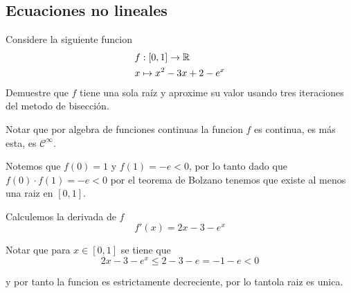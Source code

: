 \documentclass[../main.tex]{subfiles}
\begin{document}
\subsection{Ecuaciones no lineales}
\begin{problem}
  Considere la siguiente funcion
  \begin{align*}
    &f : [0, 1] \to \mathbb{R}\\
    &x \mapsto x^{2} - 3x + 2 - e^{x}
  \end{align*}
  Demuestre que $f$ tiene una sola ra\'iz y aproxime su valor usando tres iteraciones del metodo de bisecci\'on.
\end{problem}

\begin{solution}
  Notar que por algebra de funciones continuas la funcion $f$ es continua, es m\'as esta, es $\mathcal{C}^{\infty}$.

  Notemos que $f(0) = 1$ y $f(1) = -e < 0$, por lo tanto dado que $f(0)\cdot f(1) = -e < 0$ por el teorema de Bolzano tenemos que existe al menos una raiz en $[0, 1]$.

  Calculemos la derivada de $f$
  \begin{equation*}
    f'(x) = 2x - 3 - e^{x}
  \end{equation*}

  Notar que para $x \in [0,1]$ se tiene que
  \begin{equation*}
    2x - 3 - e^{x} \leq 2 - 3 - e = -1 - e < 0
  \end{equation*}

  y por tanto la funcion es estrictamente decreciente, por lo tantola raiz es unica.
\end{solution}
\end{document}
